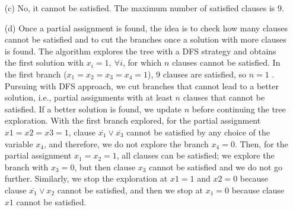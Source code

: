 \documentclass{article}
\begin{document}
\begin{itemize}
\item[(c)] No, it cannot be satisfied. The maximum number of satisfied clauses is 9.


\item[(d)] Once a partial assignment is found, the idea is to check how many clauses cannot be satisfied and to cut the branches once a solution with more clauses is found. The algorithm explores the tree with a DFS strategy and obtains the first solution with $x_i = 1,~ \forall i$, for which $n$ clauses cannot be satisfied. In the first branch ($ x_1 = x_2 = x_3 = x_4 = 1$), 9 clauses are satisfied, so $n = 1$ . 
Pursuing with DFS approach, we cut branches that cannot lead to a better solution, i.e., partial assignments with at least $n$ clauses that cannot be satisfied. If a better solution is found, we update $n$ before continuing the tree exploration. 
With the first branch explored, for the partial assignment $x1 = x2 = x3 = 1$, clause $\overline{x_1} \vee  \overline{x_3}$ cannot be satisfied by any choice of the variable $x_4$, and therefore, we do not explore the branch $x_4 = 0$. Then, for the partial assignment $x_1 = x_2 = 1$, all clauses can be satisfied; we explore the branch with $x_3 = 0$, but then clause $x_3$ cannot be satisfied and we do not go further. Similarly, we stop the exploration at $x1 = 1$ and $x2 = 0$ because clause $\overline{x_1} \vee x_2$ cannot be satisfied, and then we stop at $x_1 = 0$ because clause $x1$ cannot be satisfied.

%
\end{itemize}
\end{document}
